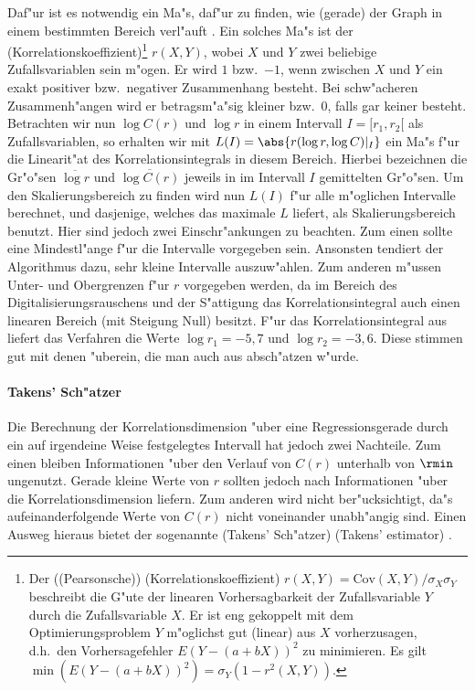 Daf"ur ist es notwendig ein Ma"s, daf"ur zu finden, wie \naja(gerade) der Graph in einem
bestimmten Bereich verl"auft \cite{raidl}. Ein solches Ma"s ist der 
\begriff(Korrelationskoeffizient)\footnote{Der (\begriff(Pearsonsche))
\begriff(Korrelationskoeffizient) $r(X,Y)=\mathrm{Cov}(X,Y)/\sigma_X \sigma_Y$ beschreibt die G"ute 
der linearen Vorhersagbarkeit der Zufallsvariable $Y$ durch die Zufallsvariable $X$. Er ist 
eng gekoppelt mit dem Optimierungsproblem $Y$ m"oglichst gut (linear) aus $X$
vorherzusagen, d.h.\  den Vorhersagefehler $E(Y-(a+bX))^2$ zu minimieren. Es gilt
$\min(E(Y-(a+bX))^2) = \sigma_Y(1-r^2(X,Y))$.} 
$r(X,Y)$, wobei $X$ und $Y$ zwei beliebige Zufallsvariablen sein m"ogen. Er wird $1$ 
bzw.\  $-1$, wenn zwischen $X$ und $Y$ ein exakt positiver bzw.\  negativer Zusammenhang
besteht. Bei schw"acheren Zusammenh"angen wird er betragsm"a"sig kleiner bzw.\  $0$, falls 
gar keiner besteht. Betrachten wir nun $\log C(r)$ und $\log r$ in einem Intervall
$I=[r_1,r_2[$ als Zufallsvariablen, so erhalten wir mit $L(I)=\abs{ r(\log r, \log
C)\rvert_{I}}$ ein Ma"s f"ur die Linearit"at des Korrelationsintegrals in diesem
Bereich.
Hierbei bezeichnen die Gr"o"sen $\overline{\log r}$ und $\overline{\log C(r)}$ jeweils in
im Intervall $I$ gemittelten Gr"o"sen. Um den Skalierungsbereich zu finden wird nun $L(I)$ 
f"ur alle m"oglichen Intervalle berechnet, und dasjenige, welches das maximale $L$
liefert, als Skalierungsbereich benutzt. Hier sind jedoch zwei Einschr"ankungen zu
beachten. Zum einen sollte eine Mindestl"ange f"ur die Intervalle vorgegeben
sein. Ansonsten tendiert der Algorithmus dazu, sehr kleine Intervalle auszuw"ahlen. Zum
anderen m"ussen Unter- und Obergrenzen f"ur $r$ vorgegeben werden, da im Bereich des
Digitalisierungsrauschens und der S"attigung das Korrelationsintegral auch einen linearen
Bereich (mit Steigung Null) besitzt. F"ur das Korrelationsintegral aus  
liefert das Verfahren die Werte $\log r_1 = -5,7$ und $\log r_2 = -3,6$. Diese stimmen gut 
mit denen "uberein, die man auch aus  absch"atzen w"urde.

\paragraph{Takens' Sch"atzer}
Die Berechnung der Korrelationsdimension "uber eine Regressionsgerade durch ein auf
irgendeine Weise festgelegtes Intervall hat jedoch zwei Nachteile. Zum einen bleiben
Informationen "uber den Verlauf von $C(r)$ unterhalb von $\rmin$ ungenutzt. Gerade kleine
Werte von $r$ sollten jedoch nach  Informationen "uber die
Korrelationsdimension liefern. Zum anderen wird nicht ber"ucksichtigt, da"s
aufeinanderfolgende Werte von $C(r)$ nicht voneinander unabh"angig sind. Einen Ausweg
hieraus bietet der sogenannte \begriff(Takens' Sch"atzer) (Takens' estimator) \cite{Takens85a}. 


